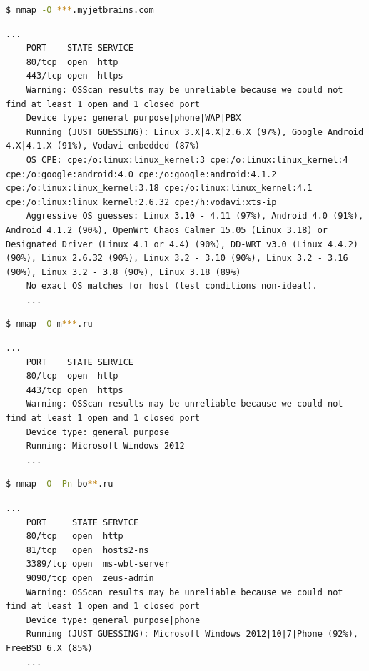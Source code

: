 \documentclass{article}
\begin{document}
\begin{lstlisting}[language=bash, basicstyle=\ttfamily\small]
    $ nmap -O ***.myjetbrains.com
\end{lstlisting}

\begin{lstlisting}[frame=lines, basicstyle=\ttfamily\small]
    ...
    PORT    STATE SERVICE
    80/tcp  open  http
    443/tcp open  https
    Warning: OSScan results may be unreliable because we could not find at least 1 open and 1 closed port
    Device type: general purpose|phone|WAP|PBX
    Running (JUST GUESSING): Linux 3.X|4.X|2.6.X (97%), Google Android 4.X|4.1.X (91%), Vodavi embedded (87%)
    OS CPE: cpe:/o:linux:linux_kernel:3 cpe:/o:linux:linux_kernel:4 cpe:/o:google:android:4.0 cpe:/o:google:android:4.1.2 cpe:/o:linux:linux_kernel:3.18 cpe:/o:linux:linux_kernel:4.1 cpe:/o:linux:linux_kernel:2.6.32 cpe:/h:vodavi:xts-ip
    Aggressive OS guesses: Linux 3.10 - 4.11 (97%), Android 4.0 (91%), Android 4.1.2 (90%), OpenWrt Chaos Calmer 15.05 (Linux 3.18) or Designated Driver (Linux 4.1 or 4.4) (90%), DD-WRT v3.0 (Linux 4.4.2) (90%), Linux 2.6.32 (90%), Linux 3.2 - 3.10 (90%), Linux 3.2 - 3.16 (90%), Linux 3.2 - 3.8 (90%), Linux 3.18 (89%)
    No exact OS matches for host (test conditions non-ideal).
    ...
\end{lstlisting}

\begin{lstlisting}[language=bash, basicstyle=\ttfamily\small]
    $ nmap -O m***.ru
\end{lstlisting}

\begin{lstlisting}[frame=lines, basicstyle=\ttfamily\small]
    ...
    PORT    STATE SERVICE
    80/tcp  open  http
    443/tcp open  https
    Warning: OSScan results may be unreliable because we could not find at least 1 open and 1 closed port
    Device type: general purpose
    Running: Microsoft Windows 2012
    ...
\end{lstlisting}

\begin{lstlisting}[language=bash, basicstyle=\ttfamily\small]
    $ nmap -O -Pn bo**.ru
\end{lstlisting}

\begin{lstlisting}[frame=lines, basicstyle=\ttfamily\small]
    ...
    PORT     STATE SERVICE
    80/tcp   open  http
    81/tcp   open  hosts2-ns
    3389/tcp open  ms-wbt-server
    9090/tcp open  zeus-admin
    Warning: OSScan results may be unreliable because we could not find at least 1 open and 1 closed port
    Device type: general purpose|phone
    Running (JUST GUESSING): Microsoft Windows 2012|10|7|Phone (92%), FreeBSD 6.X (85%)
    ...
\end{lstlisting}
\end{document}
